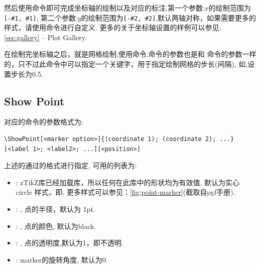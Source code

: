 然后使用命令\cmd{\ShowXYAxis}即可完成坐标轴的绘制以及对应的标注.第一个参数:$x$的绘制范围为\texttt{[-\#1, \#1]},
第二个参数:$y$的绘制范围为\texttt{[-\#2, \#2]}.默认两轴对称，如果需要更多的样式，请使用\cmd{\ShowAxis}命令进行自定义.
更多的关于坐标轴设置的样例可以参见: \cref{sec:gallery} -- Plot Gallery.

在绘制完坐标轴之后，就是网格绘制;使用\cmd{\ShowGrid}命令.\cmd{\ShowGrid}\index{\cmd{\ShowGrid}}命令的参数也是和\cmd{\ShowAxis}
命令的参数一样的，只不过此命令中可以指定一个关键字，用于指定绘制网格的步长(间隔), 如,设置步长为0.5.

\subsection{Show Point}
对应的\cmd{\ShowPoint}\index{\cmd{\ShowPoint}}命令的参数格式为:

\begin{verbatim}
\ShowPoint[<marker option>]{(coordinate 1); (coordinate 2); ...}[<label 1>; <label2>; ...][<position>]
\end{verbatim}

上述的通过的格式进行指定, 可用的列表为:

\begin{itemize}
    \item {}: zTikZ库已经加载库，所以任何在此库中的形状均为有效值, 
        默认为实心 circle 样式，即. 更多样式可以参见：\cref{fig:point-marker}(截取自pgf手册).
    \item {}: , 点的半径，默认为 1pt.
    \item {}: , 点的颜色, 默认为black.
    \item {}: , 点的透明度,默认为1，即不透明.
    \item {}: marker的旋转角度, 默认为0.
\end{itemize}


